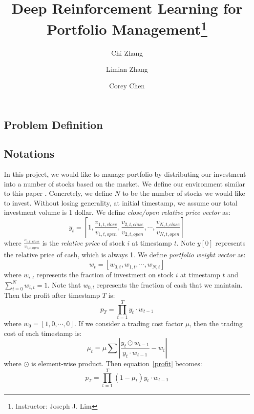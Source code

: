 \documentclass[a4paper, 10pt]{article}
\title{\textbf{Deep Reinforcement Learning for Portfolio Management}\thanks{Instructor: Joseph J. Lim}}
\author[]{Chi Zhang}
\author[]{Limian Zhang}
\author[]{Corey Chen}
\affil[]{Department of Computer Science}
\begin{document}
  \maketitle                     %
  \begin{spacing}{1.2}
    \section{Problem Definition}
    \subsection{Notations}
    In this project, we would like to manage portfolio by distributing our investment into a number of stocks based on the market. We define our environment similar to this paper \cite{DBLP:journals/corr/JiangXL17}.
    Concretely, we define $N$ to be the number of stocks we would like to invest.
    Without losing generality, at initial timestamp, we assume our total investment volume is 1 dollar. We define \emph{close/open relative price vector} as:
    \begin{equation}
    y_t=[1, \frac{v_{1,t, close}}{v_{1,t, open}}, \frac{v_{2,t, close}}{v_{2,t, open}},\cdots,\frac{v_{N,t,close}}{v_{N,t, open}}]
    \end{equation}
    where $\frac{v_{i, t, close}}{v_{i, t, open}}$ is the \emph{relative price} of stock $i$ at timestamp $t$. 
    Note $y[0]$ represents the relative price of cash, which is always 1. We define \emph{portfolio weight vector} as:
    \begin{equation}
    w_t=[w_{0,t}, w_{1, t}, \cdots, w_{N, t}]
    \end{equation}
    where $w_{i,t}$ represents the fraction of investment on stock $i$ at timestamp $t$ and $\sum_{i=0}^{N}w_{i, t}=1$. Note that $w_{0,t}$ represents the fraction of cash that we maintain. Then the profit after timestamp $T$ is:
    \begin{equation}
    \label{profit}
    p_T=\prod_{t=1}^{T}y_t\cdot w_{t-1}
    \end{equation}
    where $w_0=[1, 0, \cdots, 0]$. If we consider a trading cost factor $\mu$, then the trading cost of each timestamp is:
    \begin{equation}
    {\mu}_t=\mu\sum{|\frac{y_t \odot w_{t-1}}{y_t \cdot w_{t-1}} - w_{t}|}
    \end{equation}
    where $\odot$ is element-wise product. Then equation~\ref{profit} becomes:
    \begin{equation}
    \label{profit_mu}
    p_T=\prod_{t=1}^{T}(1-\mu_t) y_t\cdot w_{t-1}
    \end{equation}
    

\end{spacing}
\end{document}
